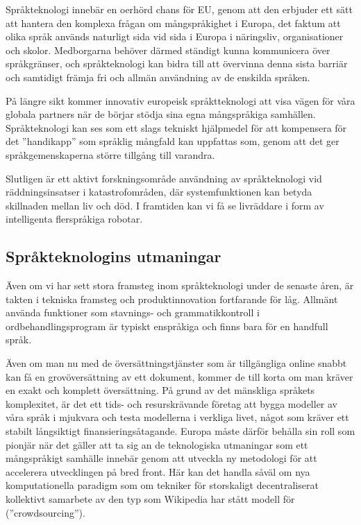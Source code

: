 \begin{multicols}{2}
Språkteknologi innebär en oerhörd chans för EU, genom att den erbjuder
ett sätt att hantera den komplexa frågan om mångspråkighet i Europa,
det faktum att olika språk används naturligt sida vid sida i Europa i
näringsliv, organisationer och skolor. Medborgarna behöver därmed
ständigt kunna kommunicera över språkgränser, och språkteknologi kan
bidra till att övervinna denna sista barriär och samtidigt främja fri
och allmän användning av de enskilda språken. 

På längre sikt kommer
innovativ europeisk språktteknologi att visa vägen för våra globala
partners när de börjar stödja sina egna mångspråkiga
samhällen. Språkteknologi kan ses som ett slags tekniskt hjälpmedel
för att kompensera för det ''handikapp'' som språklig mångfald kan
uppfattas som, genom att det ger språkgemenskaperna större tillgång
till varandra. 

Slutligen är ett aktivt forskningsområde användning av
språkteknologi vid räddningsinsatser i katastrofområden, där
systemfunktionen kan betyda skillnaden mellan liv och död. I framtiden
kan vi få se livräddare i form av intelligenta flerspråkiga robotar.


\subsection{Språkteknologins utmaningar}

Även om vi har sett stora framsteg inom språkteknologi under de
senaste åren, är takten i tekniska framsteg och produktinnovation
fortfarande för låg. Allmänt använda funktioner som stavnings- och
grammatikkontroll i ordbehandlingsprogram är typiskt enspråkiga och
finns bara för en handfull språk.


Även om man nu med de översättningstjänster som är tillgängliga online
snabbt kan få en grovöversättning av ett dokument, kommer de till
korta om man kräver en exakt och komplett översättning. På grund av
det mänskliga språkets komplexitet, är det ett tids- och
resurskrävande företag att bygga modeller av våra språk i mjukvara och
testa modellerna i verkliga livet, något som kräver ett stabilt
långsiktigt finansierings\-åtagande. Europa måste därför behålla sin
roll som pionjär när det gäller att ta sig an de teknologiska
utmaningar som ett mångspråkigt samhälle innebär genom att utveckla ny
metodologi för att accelerera utvecklingen på bred front. Här kan det
handla såväl om nya komputationella paradigm som om tekniker för
storskaligt decentraliserat kollektivt samarbete av den typ som
Wikipedia har stått modell för (''crowdsourcing'').



\end{multicols}

